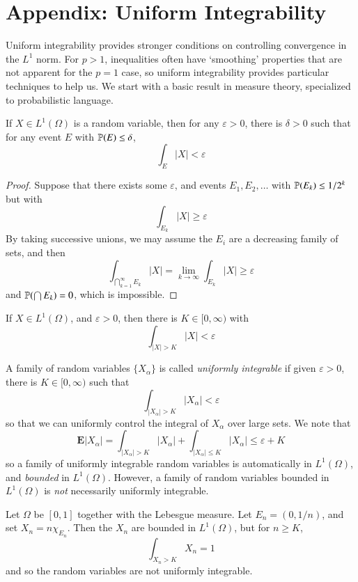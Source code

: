 \chapter{Appendix: Uniform Integrability}

Uniform integrability provides stronger conditions on controlling convergence in the $L^1$ norm. For $p > 1$, inequalities often have `smoothing' properties that are not apparent for the $p = 1$ case, so uniform integrability provides particular techniques to help us. We start with a basic result in measure theory, specialized to probabilistic language.

\begin{lemma}
    If $X \in L^1(\Omega)$ is a random variable, then for any $\varepsilon > 0$, there is $\delta > 0$ such that for any event $E$ with $\operatorname{\mathbb{P}}(E) \leq \delta$,
    \[ \int_E |X| < \varepsilon \]
\end{lemma}
\begin{proof}
    Suppose that there exists some $\varepsilon$, and events $E_1, E_2, \dots$ with $\operatorname{\mathbb{P}}(E_k) \leq 1/2^k$ but with
    \[ \int_{E_k} |X| \geq \varepsilon \]
    By taking successive unions, we may assume the $E_i$ are a decreasing family of sets, and then
    \[ \int_{\bigcap_{k = 1}^\infty E_k} |X| = \lim_{k \to \infty} \int_{E_k} |X| \geq \varepsilon \]
    and $\operatorname{\mathbb{P}}(\bigcap E_k) = 0$, which is impossible.
\end{proof}

\begin{corollary}
    If $X \in L^1(\Omega)$, and $\varepsilon > 0$, then there is $K \in [0,\infty)$ with
    \[ \int_{|X| > K} |X| < \varepsilon \]
\end{corollary}

A family of random variables $\{ X_\alpha \}$ is called \emph{uniformly integrable} if given $\varepsilon > 0$, there is $K \in [0,\infty)$ such that
%
\[ \int_{|X_\alpha| > K} |X_\alpha| < \varepsilon \]
%
so that we can uniformly control the integral of $X_\alpha$ over large sets. We note that
%
\[ \mathbf{E} |X_\alpha| = \int_{|X_\alpha| > K} |X_\alpha| + \int_{|X_\alpha| \leq K} |X_\alpha| \leq \varepsilon + K \]
%
so a family of uniformly integrable random variables is automatically in $L^1(\Omega)$, and \emph{bounded} in $L^1(\Omega)$. However, a family of random variables bounded in $L^1(\Omega)$ is \emph{not} necessarily uniformly integrable.

\begin{example}
    Let $\Omega$ be $[0,1]$ together with the Lebesgue measure. Let $E_n = (0,1/n)$, and set $X_n = n \chi_{E_n}$. Then the $X_n$ are bounded in $L^1(\Omega)$, but for $n \geq K$,
    \[ \int_{X_n > K} X_n = 1 \]
    and so the random variables are not uniformly integrable.
\end{example}


